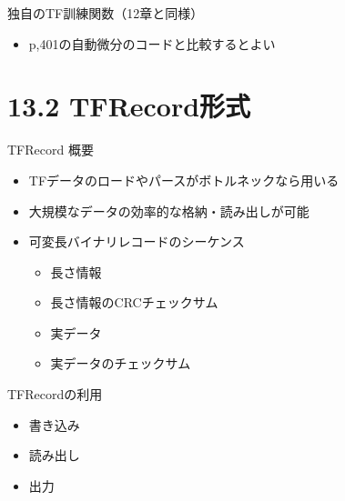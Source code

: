 \documentclass[aspectratio=169, dvipdfmx, 14pt, xcolor={svgnames,dvipsnames}, t]{beamer}
\begin{document}

\begin{frame}{独自のTF訓練関数（12章と同様）}

  \begin{itemize}
    \tightlist
    \item
          p,401の自動微分のコードと比較するとよい
  \end{itemize}

\end{frame}


\hypertarget{tfrecordux5f62ux5f0f}{%
  \section{13.2 TFRecord形式}\label{tfrecordux5f62ux5f0f}}


\begin{frame}{TFRecord 概要}

  \begin{itemize}
    \tightlist
    \item
          TFデータのロードやパースがボトルネックなら用いる
    \item
          大規模なデータの効率的な格納・読み出しが可能
    \item
          可変長バイナリレコードのシーケンス

          \begin{itemize}
            \tightlist
            \item
                  長さ情報
            \item
                  長さ情報のCRCチェックサム
            \item
                  実データ
            \item
                  実データのチェックサム
          \end{itemize}
  \end{itemize}

\end{frame}


\begin{frame}{TFRecordの利用}

  \begin{itemize}
    \tightlist
    \item
          書き込み
    \item
          読み出し
    \item
          出力
  \end{itemize}

\end{frame}
\end{document}
